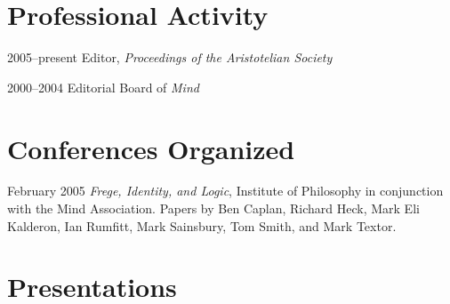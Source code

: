 \documentclass[contbibnum]{cv}
\begin{document}

\section{Professional Activity}\label{sec:professional_activity} %

\begin{topic}
    \item[2005--present] Editor, \emph{Proceedings of the Aristotelian Society}
    \item[2000--2004] Editorial Board of \emph{Mind}
\end{topic}


\section{Conferences Organized}\label{sec:conferences_organized} %

\begin{topic}
    \item[February 2005] \emph{Frege, Identity, and Logic}, Institute of Philosophy in conjunction with the Mind Association. Papers by Ben Caplan, Richard Heck, Mark Eli Kalderon, Ian Rumfitt, Mark Sainsbury, Tom Smith, and Mark Textor.
\end{topic}


\section{Presentations}\label{sec:presentations} %
\end{document}
